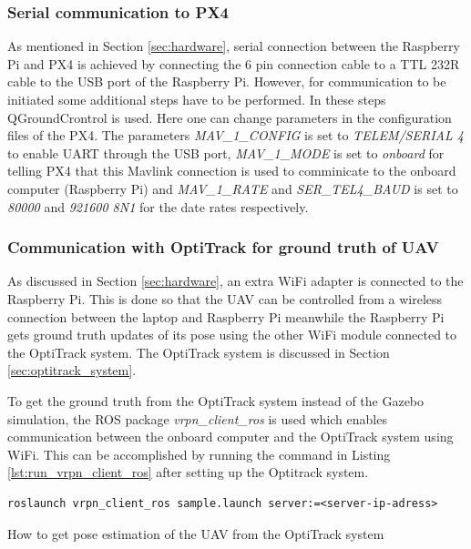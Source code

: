 \documentclass[../Head/report.tex]{subfiles}
\begin{document}
\subsubsection{Serial communication to PX4}
\label{sec:serial_communication_px4}

As mentioned in Section \ref{sec:hardware}, serial connection between the Raspberry Pi and PX4 is achieved by connecting the 6 pin connection cable to a TTL 232R cable to the USB port of the Raspberry Pi. However, for communication to be initiated some additional steps have to be performed. In these steps QGroundCrontrol is used. Here one can change parameters in the configuration files of the PX4. The parameters \textit{MAV\_1\_CONFIG} is set to \textit{TELEM/SERIAL 4} to enable UART through the USB port, \textit{ MAV\_1\_MODE} is set to \textit{onboard} for telling PX4 that this Mavlink connection is used to comminicate to the onboard computer (Raspberry Pi) and \textit{MAV\_1\_RATE} and  \textit{SER\_TEL4\_BAUD} is set to \textit{80000} and \textit{921600 8N1} for the date rates respectively.

\subsubsection{Communication with OptiTrack for ground truth of UAV}
\label{sec:communication_with_optiTrack_for_ground_truth_of_uav}

As discussed in Section \ref{sec:hardware}, an extra WiFi adapter is connected to the Raspberry Pi. This is done so that the UAV can be controlled from a wireless connection between the laptop and Raspberry Pi meanwhile the Raspberry Pi gets ground truth updates of its pose using the other WiFi module connected to the OptiTrack system. The OptiTrack system is discussed in Section \ref{sec:optitrack_system}. 

To get the ground truth from the OptiTrack system instead of the Gazebo simulation, the ROS package \textit{vrpn\_client\_ros} is used which enables communication between the onboard computer and the OptiTrack system using WiFi. This can be accomplished by running the command in Listing \ref{lst:run_vrpn_client_ros} after setting up the Optitrack system.     

\begin{listing}[H] 
\begin{tcolorbox}[
    enhanced,
    attach boxed title to top left={xshift=6mm,yshift=-3mm},
    colback=lightgreen!20,
    colframe=lightgreen,
    fonttitle=\bfseries\color{black},
]
\begin{verbatim}
roslaunch vrpn_client_ros sample.launch server:=<server-ip-adress>
\end{verbatim}
\end{tcolorbox}
\caption{How to get pose estimation of the UAV from the OptiTrack system}
\label{lst:run_vrpn_client_ros}    
\end{listing} 
 
\end{document}
